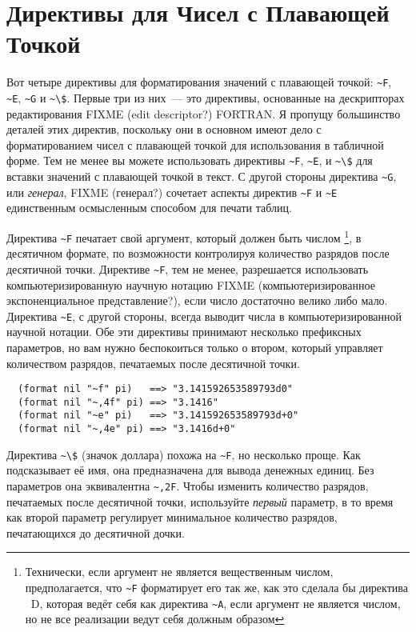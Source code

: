{\section{Директивы для Чисел с Плавающей Точкой}

Вот четыре директивы для форматирования значений с плавающей точкой: \lstinline!~F!,
\lstinline!~E!, \lstinline!~G! и \lstinline!~\$!. Первые три из них~--- это директивы,
основанные на дескрипторах редактирования FIXME (edit descriptor?) FORTRAN. Я пропущу
большинство деталей этих директив, поскольку они в основном имеют дело с форматированием
чисел с плавающей точкой для использования в табличной форме. Тем не менее вы можете
использовать директивы \lstinline!~F!, \lstinline!~E!, и \lstinline!~\$! для вставки
значений с плавающей точкой в текст.  С другой стороны директива \lstinline!~G!, или
\textit{генерал}, FIXME (генерал?)  сочетает аспекты директив \lstinline!~F! и
\lstinline!~E! единственным осмысленным способом для печати таблиц.

Директива \lstinline!~F! печатает свой аргумент, который должен быть числом
\footnote{Технически, если аргумент не является вещественным числом, предполагается, что
  \lstinline!~F! форматирует его так же, как это сделала бы директива ~D, которая ведёт
  себя как директива \lstinline!~A!, если аргумент не является числом, но не все
  реализации ведут себя должным образом}, в десятичном формате, по возможности контролируя
количество разрядов после десятичной точки. Директиве \lstinline!~F!, тем не менее,
разрешается использовать компьютеризированную научную нотацию FIXME (компьютеризированное
экспоненциальное представление?), если число достаточно велико либо мало. Директива
\lstinline!~E!, с другой стороны, всегда выводит числа в компьютеризированной научной
нотации. Обе эти директивы принимают несколько префиксных параметров, но вам нужно
беспокоиться только о втором, который управляет количеством разрядов, печатаемых после
десятичной точки.

\begin{verbatim}
  (format nil "~f" pi)   ==> "3.141592653589793d0"
  (format nil "~,4f" pi) ==> "3.1416"
  (format nil "~e" pi)   ==> "3.141592653589793d+0"
  (format nil "~,4e" pi) ==> "3.1416d+0"
\end{verbatim}

Директива \lstinline!~\$! (значок доллара) похожа на \lstinline!~F!, но несколько
проще. Как подсказывает её имя, она предназначена для вывода денежных единиц. Без
параметров она эквивалентна \lstinline!~,2F!. Чтобы изменить количество разрядов,
печатаемых после десятичной точки, используйте \textit{первый} параметр, в то время как
второй параметр регулирует минимальное количество разрядов, печатающихся до десятичной
дочки.

}
